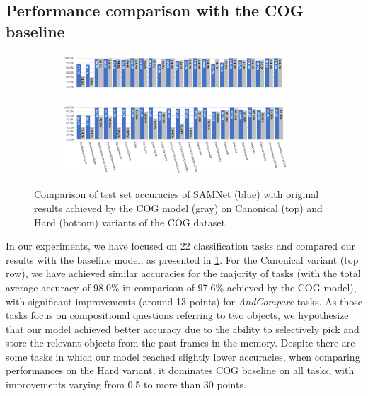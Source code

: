 \subsection{Performance comparison with the COG baseline}

\begin{figure}[htbp]
	\centering
  \begin{subfigure}{\textwidth}
    \includegraphics[width=0.92\textwidth]{../results/samnet_cog_orig_canonical_no_labels.png}
  \end{subfigure}%
  \newline
  \begin{subfigure}{\textwidth}
	\includegraphics[width=0.93\textwidth]{../results/samnet_cog_orig_hard.png}
  \end{subfigure}%
\caption{Comparison of test set accuracies of SAMNet (blue) with original results achieved by the COG model (gray) on Canonical (top) and Hard (bottom) variants of the COG dataset.}
\label{fig:samnet_cog_detailed}
\end{figure}


In our experiments, we have focused on 22 classification tasks and compared our results with the baseline model, as presented in \cref{fig:samnet_cog_detailed}.
For the Canonical variant (top row), we have achieved similar accuracies for the majority of tasks (with the total average accuracy of 98.0\% in comparison of 97.6\% achieved by the COG model), with significant improvements (around 13 points) for \textit{AndCompare} tasks.
As those tasks focus on compositional questions referring to two objects, we hypothesize that our model achieved better accuracy due to the ability to selectively pick and store the relevant objects from the past frames in the memory.
Despite there are some tasks in which our model reached slightly lower accuracies,
when comparing performances on the Hard variant, it dominates COG baseline on all tasks, with improvements varying from 0.5 to more than 30 points.

